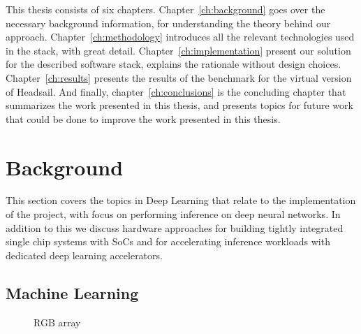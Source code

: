 \documentclass[12pt,a4paper,english
]{tunithesis}
\begin{document}
This thesis consists of six chapters. Chapter~\ref{ch:background} goes over the necessary background information, for understanding the theory behind our approach. Chapter~\ref{ch:methodology} introduces all the relevant technologies used in the stack, with great detail. Chapter~\ref{ch:implementation} present our solution for the described software stack, explains the rationale without design choices. Chapter~\ref{ch:results} presents the results of the benchmark for the virtual version of Headsail. And finally, chapter~\ref{ch:conclusions} is the concluding chapter that summarizes the work presented in this thesis, and presents topics for future work that could be done to improve the work presented in this thesis.

\chapter{Background}
This section covers the topics in Deep Learning that relate to the implementation of the project, with focus on performing inference on deep neural networks. In addition to this we discuss hardware approaches for building tightly integrated single chip systems with SoCs and for accelerating inference workloads with dedicated deep learning accelerators.
\label{ch:background}
\section{Machine Learning}
\begin{figure}
  \centering
  \caption{RGB array}
  \label{fig:rgb-array}
\end{figure}
\end{document}
